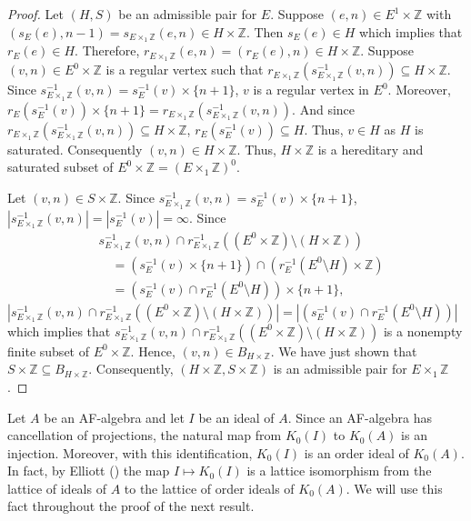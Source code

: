 \documentclass[12pt]{amsbook}%
\theoremstyle{defin}
\theoremstyle{remark}
\numberwithin{equation}{chapter}
\numberwithin{theor}{section}
\newcommand{\ZZ}{\mathbb{Z}}
\begin{document}
\begin{proof}
Let $(H, S)$ be an admissible pair for $E$.  Suppose $(e, n) \in E^{1} \times \ZZ$ with $( s_E(e) , n - 1 ) =  s_{E \times_1 \ZZ} ( e, n) \in H \times \ZZ$.  Then $s_E(e) \in H$ which implies that $r_E (e) \in H$.  Therefore, $r_{E \times_1 \ZZ }( e, n) = ( r_E (e), n ) \in H \times \ZZ$.  Suppose $(v, n ) \in E^0 \times \ZZ$ is a regular vertex such that $r_{E\times_1\ZZ } ( s_{ E \times_1\ZZ}^{-1} ( v, n ) ) \subseteq H \times \ZZ$.  Since $s_{ E \times_1\ZZ}^{-1} ( v, n ) = s_E^{-1} (v) \times \{ n+1\}$, $v$ is a regular vertex in $E^0$.  Moreover, $r_E( s_E^{-1} ( v) ) \times \{ n +1 \} = r_{E\times_1\ZZ } ( s_{ E \times_1\ZZ }^{-1} ( v, n ) )$.  And since $ r_{E\times_1\ZZ } ( s_{ E \times_1\ZZ }^{-1} ( v, n ) ) \subseteq H \times \ZZ$, $r_E( s_E^{-1} (v)) \subseteq H$.  Thus, $v \in H$ as $H$ is saturated.  Consequently $(v, n) \in H \times \ZZ$.  Thus, $H \times \ZZ$ is a hereditary and saturated subset of $E^0 \times \ZZ = (E \times_1 \ZZ)^0$.  

Let $( v, n  ) \in S \times \ZZ$.  Since $s_{ E \times_1 \ZZ}^{-1} ( v, n) = s_E^{-1} ( v ) \times \{ n +1 \}$, $| s_{E\times_1\ZZ}^{-1} ( v, n) | = | s_E^{-1} (v) | = \infty$.  Since 
\begin{align*}
&s_{E\times_1\ZZ}^{-1} ( v, n ) \cap r_{E \times_1 \ZZ}^{-1} ( (E^0 \times \ZZ) \setminus ( H \times \ZZ ) ) \\
	&\quad = ( s_E^{-1} ( v) \times \{ n+1\} ) \cap ( r_{E}^{-1} ( E^0 \setminus H) \times \ZZ ) \\
	&\quad = (s_{E}^{-1} ( v ) \cap r_{E}^{-1} ( E^0 \setminus H ) ) \times \{ n +1\},
\end{align*}
$|s_{E\times_1\ZZ}^{-1} ( v, n ) \cap r_{E \times_1 \ZZ}^{-1} ( (E^0 \times \ZZ) \setminus ( H \times \ZZ ) )  | = | (s_{E}^{-1} ( v ) \cap r_{E}^{-1} ( E^0 \setminus H ) ) |$ which implies that $s_{E\times_1\ZZ}^{-1} ( v, n ) \cap r_{E \times_1 \ZZ}^{-1} ( (E^0 \times \ZZ) \setminus ( H \times \ZZ ) )$ is a nonempty finite subset of $E^0 \times \ZZ$.  Hence, $(v, n) \in B_{ H \times \ZZ }$.  We have just shown that $S \times \ZZ \subseteq B_{ H \times \ZZ }$.  Consequently, $( H \times \ZZ , S \times \ZZ )$ is an admissible pair for $E\times_1\ZZ$.
\end{proof}

Let $A$ be an AF-algebra and let $I$ be an ideal of $A$.  Since an AF-algebra has cancellation of projections, the natural map from $K_0(I)$ to $K_0(A)$ is an injection.  Moreover, with this identification, $K_0(I)$ is an order ideal of $K_0(A)$.  In fact, by Elliott (\cite[Proposition IV.5.1]{krd:ce}) the map $I \mapsto K_0(I)$ is a lattice isomorphism from the lattice of ideals of $A$ to the lattice of order ideals of $K_0(A)$.  We will use this fact throughout the proof of the next result.
\end{document}
